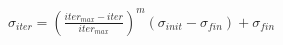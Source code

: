 $\sigma _{iter}=\left ( \frac{iter_{max}-iter}{iter_{max}} \right )^{m}\left (\sigma _{init}-\sigma _{fin}  \right )+\sigma _{fin}$